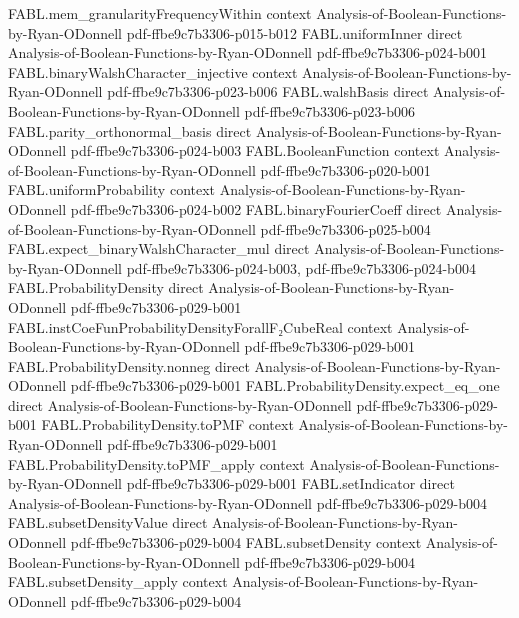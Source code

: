 \begin{theorem}
\proofstep
  {FABL.mem_granularityFrequencyWithin}
  {context}
  {Analysis-of-Boolean-Functions-by-Ryan-ODonnell}
  {pdf-ffbe9c7b3306-p015-b012}
\proofstep
  {FABL.uniformInner}
  {direct}
  {Analysis-of-Boolean-Functions-by-Ryan-ODonnell}
  {pdf-ffbe9c7b3306-p024-b001}
\proofstep
  {FABL.binaryWalshCharacter_injective}
  {context}
  {Analysis-of-Boolean-Functions-by-Ryan-ODonnell}
  {pdf-ffbe9c7b3306-p023-b006}
\proofstep
  {FABL.walshBasis}
  {direct}
  {Analysis-of-Boolean-Functions-by-Ryan-ODonnell}
  {pdf-ffbe9c7b3306-p023-b006}
\proofstep
  {FABL.parity_orthonormal_basis}
  {direct}
  {Analysis-of-Boolean-Functions-by-Ryan-ODonnell}
  {pdf-ffbe9c7b3306-p024-b003}
\proofstep
  {FABL.BooleanFunction}
  {context}
  {Analysis-of-Boolean-Functions-by-Ryan-ODonnell}
  {pdf-ffbe9c7b3306-p020-b001}
\proofstep
  {FABL.uniformProbability}
  {context}
  {Analysis-of-Boolean-Functions-by-Ryan-ODonnell}
  {pdf-ffbe9c7b3306-p024-b002}
\proofstep
  {FABL.binaryFourierCoeff}
  {direct}
  {Analysis-of-Boolean-Functions-by-Ryan-ODonnell}
  {pdf-ffbe9c7b3306-p025-b004}
\proofstep
  {FABL.expect_binaryWalshCharacter_mul}
  {direct}
  {Analysis-of-Boolean-Functions-by-Ryan-ODonnell}
  {pdf-ffbe9c7b3306-p024-b003,
    pdf-ffbe9c7b3306-p024-b004}
\proofstep
  {FABL.ProbabilityDensity}
  {direct}
  {Analysis-of-Boolean-Functions-by-Ryan-ODonnell}
  {pdf-ffbe9c7b3306-p029-b001}
\proofstep
  {FABL.instCoeFunProbabilityDensityForallF₂CubeReal}
  {context}
  {Analysis-of-Boolean-Functions-by-Ryan-ODonnell}
  {pdf-ffbe9c7b3306-p029-b001}
\proofstep
  {FABL.ProbabilityDensity.nonneg}
  {direct}
  {Analysis-of-Boolean-Functions-by-Ryan-ODonnell}
  {pdf-ffbe9c7b3306-p029-b001}
\proofstep
  {FABL.ProbabilityDensity.expect_eq_one}
  {direct}
  {Analysis-of-Boolean-Functions-by-Ryan-ODonnell}
  {pdf-ffbe9c7b3306-p029-b001}
\proofstep
  {FABL.ProbabilityDensity.toPMF}
  {context}
  {Analysis-of-Boolean-Functions-by-Ryan-ODonnell}
  {pdf-ffbe9c7b3306-p029-b001}
\proofstep
  {FABL.ProbabilityDensity.toPMF_apply}
  {context}
  {Analysis-of-Boolean-Functions-by-Ryan-ODonnell}
  {pdf-ffbe9c7b3306-p029-b001}
\proofstep
  {FABL.setIndicator}
  {direct}
  {Analysis-of-Boolean-Functions-by-Ryan-ODonnell}
  {pdf-ffbe9c7b3306-p029-b004}
\proofstep
  {FABL.subsetDensityValue}
  {direct}
  {Analysis-of-Boolean-Functions-by-Ryan-ODonnell}
  {pdf-ffbe9c7b3306-p029-b004}
\proofstep
  {FABL.subsetDensity}
  {context}
  {Analysis-of-Boolean-Functions-by-Ryan-ODonnell}
  {pdf-ffbe9c7b3306-p029-b004}
\proofstep
  {FABL.subsetDensity_apply}
  {context}
  {Analysis-of-Boolean-Functions-by-Ryan-ODonnell}
  {pdf-ffbe9c7b3306-p029-b004}

\end{theorem}
